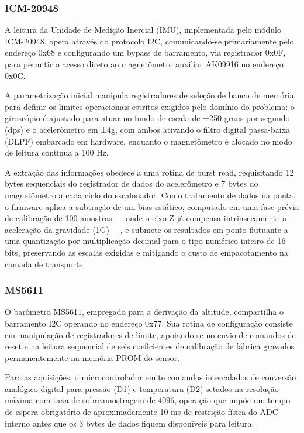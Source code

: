 \subsubsection{ICM-20948}
A leitura da Unidade de Medição Inercial (IMU), implementada pelo módulo ICM-20948, opera através do protocolo I2C, comunicando-se primariamente pelo endereço 0x68 e configurando um bypass de barramento, via registrador 0x0F, para permitir o acesso direto ao magnetômetro auxiliar AK09916 no endereço 0x0C. 

A parametrização inicial manipula registradores de seleção de banco de memória para definir os limites operacionais estritos exigidos pelo domínio do problema: o giroscópio é ajustado para atuar no fundo de escala de ±250 graus por segundo (dps) e o acelerômetro em ±4g, com ambos ativando o filtro digital passa-baixa (DLPF) embarcado em hardware, enquanto o magnetômetro é alocado no modo de leitura contínua a 100 Hz.

A extração das informações obedece a uma rotina de burst read, requisitando 12 bytes sequenciais do registrador de dados do acelerômetro e 7 bytes do magnetômetro a cada ciclo do escalonador. Como tratamento de dados na ponta, o firmware aplica a subtração de um bias estático, computado em uma fase prévia de calibração de 100 amostras — onde o eixo Z já compensa intrinsecamente a aceleração da gravidade (1G) —, e submete os resultados em ponto flutuante a uma quantização por multiplicação decimal para o tipo numérico inteiro de 16 bits, preservando as escalas exigidas e mitigando o custo de empacotamento na camada de transporte.

\subsubsection{MS5611}
O barômetro MS5611, empregado para a derivação da altitude, compartilha o barramento I2C operando no endereço 0x77. Sua rotina de configuração consiste em manipulação de registradores de limite, apoiando-se no envio de comandos de reset e na leitura sequencial de seis coeficientes de calibração de fábrica gravados permanentemente na memória PROM do sensor. 

Para as aquisições, o microcontrolador emite comandos intercalados de conversão analógico-digital para pressão (D1) e temperatura (D2) setados na resolução máxima com taxa de sobreamostragem de 4096, operação que impõe um tempo de espera obrigatório de aproximadamente 10 ms de restrição física do ADC interno antes que os 3 bytes de dados fiquem disponíveis para leitura. 

